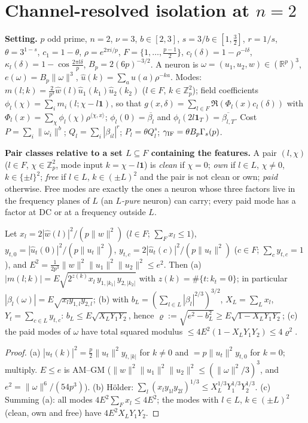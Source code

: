 \documentclass[11pt]{article}
\theoremstyle{remark}\newtheorem{remark}[theorem]{Remark}
\begin{document}
\section*{Channel-resolved isolation at $n=2$}

\textbf{Setting.} $p$ odd prime, $n=2$, $\nu=3$, $b\in[2,3]$, $s=3/b\in[1,\tfrac32]$, $r=1/s$, $\theta=3^{1-s}$, $c_1=1-\theta$,
$\rho=e^{2\pi i/p}$, $F=\{1,\dots,\frac{p-1}2\}$, $c_l(\delta)=1-\rho^{-l\delta}$, $\kappa_l(\delta)=1-\cos\frac{2\pi l\delta}p$,
$B_p=2(6p)^{-3/2}$.  A neuron is $\omega=(u_1,u_2,w)\in(\mathbb R^p)^3$, $e(\omega)=B_p\|\omega\|^3$, $\hat u(k)=\sum_au(a)\rho^{-ka}$.
Modes: $m(l;k)=\frac2{p^3}\hat w(l)\hat u_1(k_1)\hat u_2(k_2)$ ($l\in F$, $k\in\mathbb Z_p^2$); field coefficients
$\phi_l(\chi)=\sum_i m_i(l;\chi-l\mathbf 1)$, so that $g(x,\delta)=\sum_{l\in F}\Re(\Phi_l(x)c_l(\delta))$ with
$\Phi_l(x)=\sum_\chi\phi_l(\chi)\rho^{\langle\chi,x\rangle}$; $\phi_l(0)=\overline{\beta_l}$ and $\phi_l(2l\mathbf 1_T)=\overline{\beta_{l,T}}$.
Cost $P=\sum_i\|\omega_i\|^b$; $Q_l=\sum_i|\beta_{il}|^r$; $P_l=\theta Q_l^s$; $\gamma_{\rm IF}=\theta B_p\Gamma_s(p)$.

\textbf{Pair classes relative to a set $L\subseteq F$ containing the features.}  A pair $(l,\chi)$ ($l\in F$, $\chi\in\mathbb Z_p^2$, mode
input $k=\chi-l\mathbf 1$) is \emph{clean} if $\chi=0$; \emph{own} if $l\in L$, $\chi\ne0$, $k\in\{\pm l\}^2$; \emph{free} if $l\in L$,
$k\in(\pm L)^2$ and the pair is not clean or own; \emph{paid} otherwise.  Free modes are exactly the ones a neuron whose three factors
live in the frequency planes of $L$ (an \emph{$L$-pure} neuron) can carry; every paid mode has a factor at DC or at a frequency outside $L$.

\begin{lemma}\label{l:modes}
Let $x_l=2|\hat w(l)|^2/(p\|w\|^2)$ ($l\in F$; $\sum_Fx_l\le1$), $y_{t,0}=|\hat u_t(0)|^2/(p\|u_t\|^2)$, $y_{t,c}=2|\hat u_t(c)|^2/(p\|u_t\|^2)$
($c\in F$; $\sum_cy_{t,c}=1$), and $E^2=\frac1{2p^3}\|w\|^2\|u_1\|^2\|u_2\|^2\le e^2$.  Then
(a) $|m(l;k)|=E\sqrt{2^{z(k)}x_l\,y_{1,|k_1|}\,y_{2,|k_2|}}$ with $z(k)=\#\{t:k_t=0\}$; in particular $|\beta_l(\omega)|=E\sqrt{x_ly_{1,l}y_{2,l}}$;
(b) with $b_L=(\sum_{l\in L}|\beta_l|^{2/3})^{3/2}$, $X_L=\sum_Lx_l$, $Y_t=\sum_{c\in L}y_{t,c}$:
$b_L\le E\sqrt{X_LY_1Y_2}$, hence $\varrho:=\sqrt{e^2-b_L^2}\ge E\sqrt{1-X_LY_1Y_2}$;
(c) the paid modes of $\omega$ have total squared modulus $\le4E^2(1-X_LY_1Y_2)\le4\varrho^2$.
\end{lemma}
\begin{proof}
(a) $|\hat u_t(k)|^2=\frac p2\|u_t\|^2y_{t,|k|}$ for $k\ne0$ and $=p\|u_t\|^2y_{t,0}$ for $k=0$; multiply.  $E\le e$ is AM--GM
($\|w\|^2\|u_1\|^2\|u_2\|^2\le(\|\omega\|^2/3)^3$, and $e^2=\|\omega\|^6/(54p^3)$).  (b) H\"older:
$\sum_l(x_ly_{1l}y_{2l})^{1/3}\le X_L^{1/3}Y_1^{1/3}Y_2^{1/3}$.  (c) Summing (a): all modes $4E^2\sum_Fx_l\le4E^2$; the modes with
$l\in L$, $k\in(\pm L)^2$ (clean, own and free) have $4E^2X_LY_1Y_2$.
\end{proof}
\end{document}
